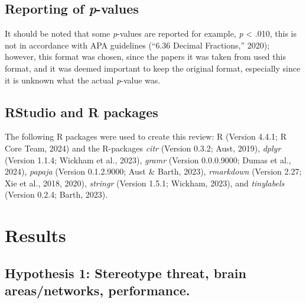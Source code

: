 \documentclass[
  stu, a4paper,floatsintext]{apa7}
\begin{document}
\subsection{\texorpdfstring{Reporting of \emph{p}-values}{Reporting of p-values}}\label{reporting-of-p-values}

It should be noted that some \emph{p}-values are reported for example, \emph{p} \textless{} .010, this is not in accordance with APA guidelines ({``6.36 {Decimal Fractions},''} 2020); however, this format was chosen, since the papers it was taken from used this format, and it was deemed important to keep the original format, especially since it is unknown what the actual \emph{p}-value was.

\subsection{RStudio and R packages}\label{rstudio-and-r-packages}

The following R packages were used to create this review: R (Version 4.4.1; R Core Team, 2024) and the R-packages \emph{citr} (Version 0.3.2; Aust, 2019), \emph{dplyr} (Version 1.1.4; Wickham et al., 2023), \emph{gramr} (Version 0.0.0.9000; Dumas et al., 2024), \emph{papaja} (Version 0.1.2.9000; Aust \& Barth, 2023), \emph{rmarkdown} (Version 2.27; Xie et al., 2018, 2020), \emph{stringr} (Version 1.5.1; Wickham, 2023), and \emph{tinylabels} (Version 0.2.4; Barth, 2023).

\section{Results}\label{results}

\subsection{Hypothesis 1: Stereotype threat, brain areas/networks, performance.}\label{hypothesis-1-stereotype-threat-brain-areasnetworks-performance.}
\end{document}

